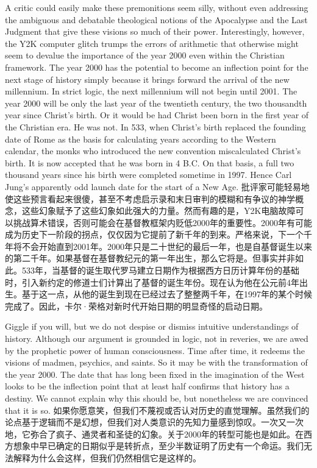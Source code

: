 \begin{Parallel}{97mm}{45mm}
  \ParallelLText
  {A critic could easily make these premonitions seem silly, without even addressing the ambiguous and debatable theological notions of the Apocalypse and the Last Judgment that give these visions so much of their power. Interestingly, however, the Y2K computer glitch trumps the errors of arithmetic that otherwise might seem to devalue the importance of the year 2000 even within the Christian framework. The year 2000 has the potential to become an inflection point for the next stage of history simply because it brings forward the arrival of the new millennium. In strict logic, the next millennium will not begin until 2001. The year 2000 will be only the last year of the twentieth century, the two thousandth year since Christ's birth. Or it would be had Christ been born in the first year of the Christian era. He was not. In 533, when Christ's birth replaced the founding date of Rome as the basis for calculating years according to the Western calendar, the monks who introduced the new convention miscalculated Christ's birth. It is now accepted that he was born in 4 B.C. On that basis, a full two thousand years since his birth were completed sometime in 1997. Hence Carl Jung's apparently odd launch date for the start of a New Age. }  
  \ParallelRText
  {\small 批评家可能轻易地使这些预言看起来很傻，甚至不考虑启示录和末日审判的模糊和有争议的神学概念，这些幻象赋予了这些幻象如此强大的力量。然而有趣的是，Y2K电脑故障可以挑战算术错误，否则可能会在基督教框架内贬低2000年的重要性。2000年有可能成为历史下一阶段的拐点，仅仅因为它提前了新千年的到来。严格来说，下一个千年将不会开始直到2001年。2000年只是二十世纪的最后一年，也是自基督诞生以来的第二千年。如果基督在基督教纪元的第一年出生，那么它将是。但事实并非如此。533年，当基督的诞生取代罗马建立日期作为根据西方日历计算年份的基础时，引入新约定的修道士们计算出了基督的诞生年份。现在认为他在公元前4年出生。基于这一点，从他的诞生到现在已经过去了整整两千年，在1997年的某个时候完成了。因此，卡尔·荣格对新时代开始日期的明显奇怪的启动日期。}
  \ParallelPar


  \ParallelLText
  {Giggle if you will, but we do not despise or dismiss intuitive understandings of history. Although our argument is grounded in logic, not in reveries, we are awed by the prophetic power of human consciousness. Time after time, it redeems the visions of madmen, psychics, and saints. So it may be with the transformation of the year 2000. The date that has long been fixed in the imagination of the West looks to be the inflection point that at least half confirms that history has a destiny. We cannot explain why this should be, but nonetheless we are convinced that it is so.  }  
  \ParallelRText
  {\small 如果你愿意笑，但我们不蔑视或否认对历史的直觉理解。虽然我们的论点基于逻辑而不是幻想，但我们对人类意识的先知力量感到惊叹。一次又一次地，它弥合了疯子、通灵者和圣徒的幻象。关于2000年的转型可能也是如此。在西方想象中早已确定的日期似乎是转折点，至少半数证明了历史有一个命运。我们无法解释为什么会这样，但我们仍然相信它是这样的。}
  \ParallelPar



\end{Parallel}
